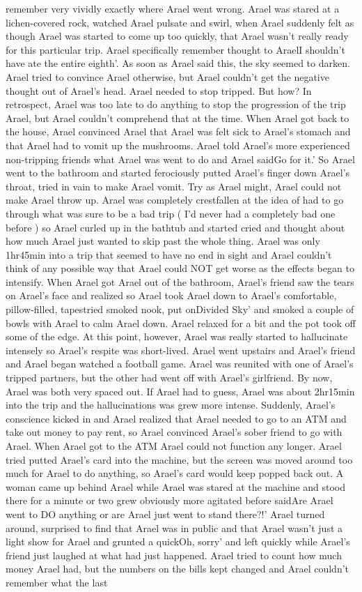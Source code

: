 \documentclass[12pt]{book}
\begin{document}
remember very vividly exactly where Arael went wrong. Arael was stared at a lichen-covered rock, watched Arael pulsate and swirl, when Arael suddenly felt as though Arael was started to come up too quickly, that Arael wasn't really ready for this particular trip. Arael specifically remember thought to AraelI shouldn't have ate the entire eighth'. As soon as Arael said this, the sky seemed to darken. Arael tried to convince Arael otherwise, but Arael couldn't get the negative thought out of Arael's head. Arael needed to stop tripped. But how? In retrospect, Arael was too late to do anything to stop the progression of the trip Arael, but Arael couldn't comprehend that at the time. When Arael got back to the house, Arael convinced Arael that Arael was felt sick to Arael's stomach and that Arael had to vomit up the mushrooms. Arael told Arael's more experienced non-tripping friends what Arael was went to do and Arael saidGo for it.' So Arael went to the bathroom and started ferociously putted Arael's finger down Arael's throat, tried in vain to make Arael vomit. Try as Arael might, Arael could not make Arael throw up. Arael was completely crestfallen at the idea of had to go through what was sure to be a bad trip ( I'd never had a completely bad one before ) so Arael curled up in the bathtub and started cried and thought about how much Arael just wanted to skip past the whole thing. Arael was only 1hr45min into a trip that seemed to have no end in sight and Arael couldn't think of any possible way that Arael could NOT get worse as the effects began to intensify. When Arael got Arael out of the bathroom, Arael's friend saw the tears on Arael's face and realized so Arael took Arael down to Arael's comfortable, pillow-filled, tapestried smoked nook, put onDivided Sky' and smoked a couple of bowls with Arael to calm Arael down. Arael relaxed for a bit and the pot took off some of the edge. At this point, however, Arael was really started to hallucinate intensely so Arael's respite was short-lived. Arael went upstairs and Arael's friend and Arael began watched a football game. Arael was reunited with one of Arael's tripped partners, but the other had went off with Arael's girlfriend. By now, Arael was both very spaced out. If Arael had to guess, Arael was about 2hr15min into the trip and the hallucinations was grew more intense. Suddenly, Arael's conscience kicked in and Arael realized that Arael needed to go to an ATM and take out money to pay rent, so Arael convinced Arael's sober friend to go with Arael. When Arael got to the ATM Arael could not function any longer. Arael tried putted Arael's card into the machine, but the screen was moved around too much for Arael to do anything, so Arael's card would keep popped back out. A woman came up behind Arael while Arael was stared at the machine and stood there for a minute or two grew obviously more agitated before saidAre Arael went to DO anything or are Arael just went to stand there?!' Arael turned around, surprised to find that Arael was in public and that Arael wasn't just a light show for Arael and grunted a quickOh, sorry' and left quickly while Arael's friend just laughed at what had just happened. Arael tried to count how much money Arael had, but the numbers on the bills kept changed and Arael couldn't remember what the last 
\end{document}
